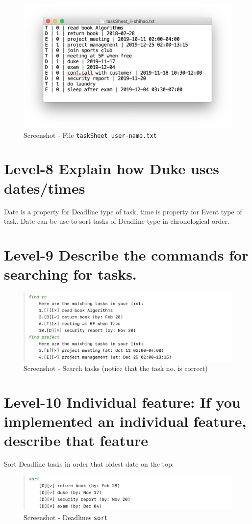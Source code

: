 \documentclass[a4paper,11pt, twoside]{article}
\begin{document}
\begin{table} [htbp]
\begin{figure}[H]
\centering
\includegraphics[width = 13.8cm]{file.png}
\caption{Screenshot - File \texttt{taskSheet\_user-name.txt}} 
\end{figure} 

\section* {Level-8 Explain how Duke uses dates/times} 
Date is a property for Deadline type of task, time is property for Event type of task. 
Date can be use to sort tasks of Deadline type in chronological order.  

\section* {Level-9 Describe the commands for searching for tasks.} 
\begin{figure}[H]
\centering
\includegraphics[width = 15.4cm]{find.png}
\caption{Screenshot - Search tasks (notice that the task no. is correct)} 
\end{figure} 


\section* {Level-10 Individual feature: If you implemented an individual feature, describe that feature} 
Sort Deadline tasks in order that oldest date on the top:
\begin{figure}[H]
\centering
\includegraphics[width = 15.4cm]{sort.png}
\caption{Screenshot - Deadlines \texttt{sort}} 
\end{figure} 


\end{table}
\end{document}
